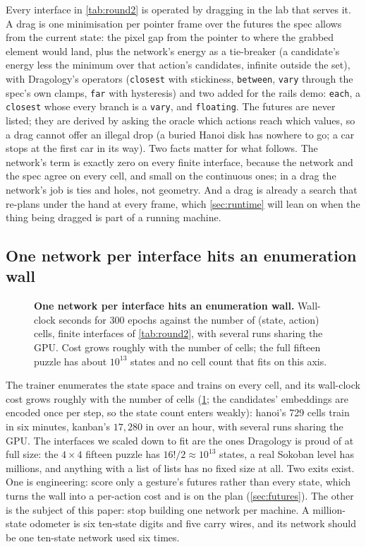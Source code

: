 Every interface in \cref{tab:round2} is operated by dragging in the lab that serves it. A drag is one
minimisation per pointer frame over the futures the spec allows from the current state: the pixel gap from
the pointer to where the grabbed element would land, plus the network's energy as a tie-breaker (a candidate's
energy less the minimum over that action's candidates, infinite outside the set), with
Dragology's operators (\texttt{closest} with stickiness, \texttt{between}, \texttt{vary} through the spec's
own clamps, \texttt{far} with hysteresis) and two added for the rails demo: \texttt{each}, a \texttt{closest}
whose every branch is a \texttt{vary}, and \texttt{floating}. The futures are never listed; they are derived by
asking the oracle which actions reach which values, so a drag cannot offer an illegal drop (a buried Hanoi disk
has nowhere to go; a car stops at the first car in its way). Two facts matter for what follows. The network's
term is exactly zero on every finite interface, because the network and the spec agree on every cell, and small
on the continuous ones; in a drag the network's job is ties and holes, not geometry. And a drag is already a
search that re-plans under the hand at every frame, which \cref{sec:runtime} will lean on when the thing being
dragged is part of a running machine.

\subsection{One network per interface hits an enumeration wall}
\label{sec:wall}

\begin{figure}[t]
\centering

\caption{\textbf{One network per interface hits an enumeration wall.} Wall-clock seconds for 300 epochs
against the number of (state, action) cells, finite interfaces of \cref{tab:round2}, with several runs sharing
the GPU. Cost grows roughly with the number of cells; the full fifteen puzzle has about $10^{13}$ states and
no cell count that fits on this axis.}
\label{fig:cost}
\end{figure}

The trainer enumerates the state space and trains on every cell, and its wall-clock cost grows roughly with
the number of cells (\cref{fig:cost}; the candidates' embeddings are encoded once per step, so the state count
enters weakly): hanoi's 729 cells train in six minutes, kanban's $17{,}280$ in over an hour, with several runs
sharing the GPU. The interfaces we scaled down to fit are the ones
Dragology is proud of at full size: the $4\times4$ fifteen puzzle has $16!/2\approx10^{13}$ states, a real
Sokoban level has millions, and anything with a list of lists has no fixed size at all. Two exits exist. One is
engineering: score only a gesture's futures rather than every state, which turns the wall into a per-action
cost and is on the plan (\cref{sec:futures}). The other is the subject of this paper: stop building one network
per machine. A million-state odometer is six ten-state digits and five carry wires, and its network should be
one ten-state network used six times.
